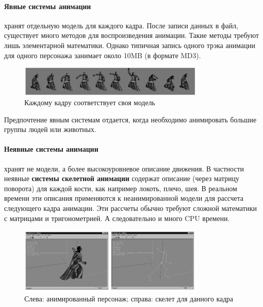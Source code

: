 \paragraph{Явные системы анимации} хранят отдельную модель для каждого кадра.
После записи данных в файл, существует много методов для воспроизведения анимации.
Такие методы требуют лишь элементарной математики.
Однако типичная запись одного трэка анимации для одного персонажа занимает около 10MB (в формате MD3).

\begin{figure}[h!]
    \centering
    \includegraphics[width=0.8\textwidth]{explicit_animation.png}
    \caption{Каждому кадру соответствует своя модель}
\end{figure}

Предпочтение явным системам отдается, когда необходимо анимировать большие группы людей или животных.

\paragraph{Неявные системы анимации} хранят не модели, а более высокоуровневое описание движения.
В частности неявные \textbf{системы скелетной анимации} содержат описание (через матрицу поворота) для каждой кости, как например локоть, плечо, шея.
В реальном времени эти описания применяются к неанимированной модели для рассчета следующего кадра анимации.
Эти рассчеты обычно требуют сложной математики с матрицами и тригонометрией.
А следовательно и много CPU времени.


\begin{figure}[h!]
    \centering
    \includegraphics[width=0.8\textwidth]{implicit_animation.png}
    \caption{\scriptsize{Слева: анимированный персонаж; справа: скелет для данного кадра}}
\end{figure}

